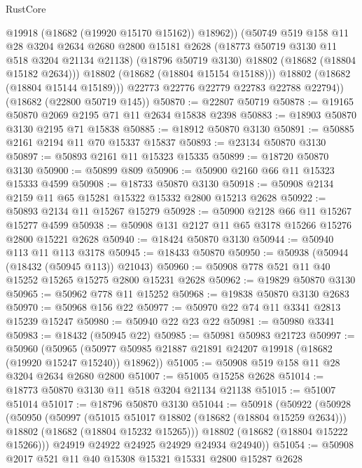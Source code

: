 \begin{lexlean}{RustCore}
\begin{coremodule}
                @19918
                (@18682 (@19920 @15170 @15162))
                @18962))
            (@50749
              @519
              @158
              @11
              @28
              @3204
              @2634
              @2680
              @2800
              @15181
              @2628
              (@18773 @50719 @3130 @11 @518 @3204 @21134 @21138)
              (@18796 @50719 @3130)
              @18802
              (@18682 (@18804 @15182 @2634)))
            @18802
            (@18682 (@18804 @15154 @15188)))
          @18802
          (@18682 (@18804 @15144 @15189)))
        @22773
        @22776
        @22779
        @22783
        @22788
        @22794))
    (@18682 (@22800 @50719 @145))
@50870 := @22807 @50719
@50878 := @19165 @50870 @2069 @2195 @71 @11 @2634 @15838 @2398
@50883 := @18903 @50870 @3130 @2195 @71 @15838
@50885 := @18912 @50870 @3130
@50891 := @50885 @2161 @2194 @11 @70 @15337 @15837
@50893 := @23134 @50870 @3130
@50897 := @50893 @2161 @11 @15323 @15335
@50899 := @18720 @50870 @3130
@50900 := @50899 @809
@50906 := @50900 @2160 @66 @11 @15323 @15333 @4599
@50908 := @18733 @50870 @3130
@50918 := @50908 @2134 @2159 @11 @65 @15281 @15322 @15332 @2800 @15213 @2628
@50922 := @50893 @2134 @11 @15267 @15279
@50928 := @50900 @2128 @66 @11 @15267 @15277 @4599
@50938 := @50908 @131 @2127 @11 @65 @3178 @15266 @15276 @2800 @15221 @2628
@50940 := @18424 @50870 @3130
@50944 := @50940 @113 @11 @113 @3178
@50945 := @18433 @50870
@50950 := @50938 (@50944 (@18432 (@50945 @113)) @21043)
@50960 := @50908 @778 @521 @11 @40 @15252 @15265 @15275 @2800 @15231 @2628
@50962 := @19829 @50870 @3130
@50965 := @50962 @778 @11 @15252
@50968 := @19838 @50870 @3130 @2683
@50970 := @50968 @156 @22
@50977 := @50970 @22 @74 @11 @3341 @2813 @15239 @15247
@50980 := @50940 @22 @23 @22
@50981 := @50980 @3341
@50983 := @18432 (@50945 @22)
@50985 := @50981 @50983 @21723
@50997 := @50960
    (@50965 (@50977 @50985 @21887 @21891 @24207 @19918 (@18682 (@19920 @15247 @15240)) @18962))
@51005 := @50908 @519 @158 @11 @28 @3204 @2634 @2680 @2800
@51007 := @51005 @15258 @2628
@51014 := @18773 @50870 @3130 @11 @518 @3204 @21134 @21138
@51015 := @51007 @51014
@51017 := @18796 @50870 @3130
@51044 := @50918
    (@50922
      (@50928
        (@50950
          (@50997
            (@51015 @51017 @18802 (@18682 (@18804 @15259 @2634)))
            @18802
            (@18682 (@18804 @15232 @15265)))
          @18802
          (@18682 (@18804 @15222 @15266)))
        @24919
        @24922
        @24925
        @24929
        @24934
        @24940))
@51054 := @50908 @2017 @521 @11 @40 @15308 @15321 @15331 @2800 @15287 @2628

\end{coremodule}
\end{lexlean}
